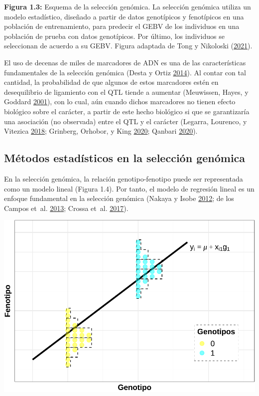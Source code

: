 \documentclass[11pt,spanish,a4paper,oneside,]{book} %
\begin{document}
\begin{center}
\textbf{Figura 1.3:} Esquema de la selección genómica. La selección genómica utiliza un modelo estadístico, diseñado a partir de datos genotípicos y fenotípicos en una población de entrenamiento, para predecir el GEBV de los individuos en una población de prueba con datos genotípicos. Por último, los individuos se seleccionan de acuerdo a su GEBV. Figura adaptada de Tong y Nikoloski (\protect\hyperlink{ref-cite:7}{2021}).

\end{center}

El uso de decenas de miles de marcadores de ADN es una de las características fundamentales de la selección genómica (Desta y Ortiz \protect\hyperlink{ref-cite:10}{2014}). Al contar con tal cantidad, la probabilidad de que algunos de estos marcadores estén en desequilibrio de ligamiento con el QTL tiende a aumentar (Meuwissen, Hayes, y Goddard \protect\hyperlink{ref-cite:8}{2001}), con lo cual, aún cuando dichos marcadores no tienen efecto biológico sobre el carácter, a partir de este hecho biológico si que se garantizaría una asociación (no observada) entre el QTL y el carácter (Legarra, Lourenco, y Vitezica \protect\hyperlink{ref-cite:30}{2018}; Grinberg, Orhobor, y King \protect\hyperlink{ref-cite:35}{2020}; Qanbari \protect\hyperlink{ref-cite:36}{2020}).

\hypertarget{muxe9todos-estaduxedsticos-en-la-selecciuxf3n-genuxf3mica}{%
\subsection{Métodos estadísticos en la selección genómica}\label{muxe9todos-estaduxedsticos-en-la-selecciuxf3n-genuxf3mica}}

En la selección genómica, la relación genotipo-fenotipo puede ser representada como un modelo lineal (Figura 1.4). Por tanto, el modelo de regresión lineal es un enfoque fundamental en la selección genómica (Nakaya y Isobe \protect\hyperlink{ref-cite:6}{2012}; de los Campos et~al. \protect\hyperlink{ref-cite:31}{2013}; Crossa et~al. \protect\hyperlink{ref-cite:37}{2017}).

\begin{center}\includegraphics[width=1\linewidth]{figures/Mod_RL} \end{center}
\end{document}
